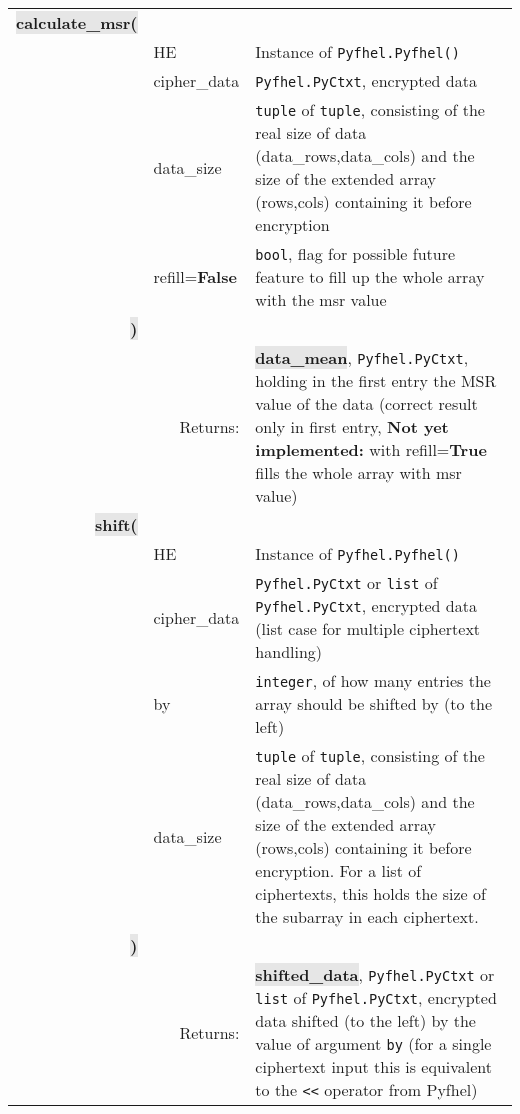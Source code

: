 \documentclass[a4paper]{article}
\newcommand{\python}[1]{\texttt{#1}}
\newcommand{\pymethod}[1]{{\ttfamily\colorbox[HTML]{e6e6e6}{\color[HTML]{0066ba}\textbf{\small #1}}}}
\newcommand{\pyreturn}[1]{{\ttfamily\colorbox[HTML]{e6e6e6}{\color[HTML]{ba0066}\textbf{\small #1}}}}
\newcommand{\textbool}[1]{{\color[HTML]{008700}\textbf{\small #1}}}
\begin{document}
\begin{tabular}{r|p{3cm}|p{8cm}}
\pymethod{calculate\_msr(}&&\\
&HE&Instance of \python{Pyfhel.Pyfhel()}\\
&cipher\_data&\python{Pyfhel.PyCtxt}, encrypted data\\
&data\_size&\python{tuple} of \python{tuple}, consisting of the real size of data (data\_rows,data\_cols) and the size of the extended array (rows,cols) containing it before encryption\\
&refill=\textbool{False}&\python{bool}, flag for possible future feature to fill up the whole array with the msr value\\
\pymethod{)}&&\\
&\multicolumn{1}{r|}{Returns:}&\pyreturn{data\_mean}, \python{Pyfhel.PyCtxt}, holding in the first entry the MSR value of the data (correct result only in first entry, \textbf{Not yet implemented:} with refill=\textbool{True} fills the whole array with msr value)\\
\hline
\pymethod{shift(}&&\\
&HE&Instance of \python{Pyfhel.Pyfhel()}\\
&cipher\_data&\python{Pyfhel.PyCtxt} or \python{list} of \python{Pyfhel.PyCtxt}, encrypted data (list case for multiple ciphertext handling)\\
&by&\python{integer}, of how many entries the array should be shifted by (to the left)\\
&data\_size&\python{tuple} of \python{tuple}, consisting of the real size of data (data\_rows,data\_cols) and the size of the extended array (rows,cols) containing it before encryption. For a list of ciphertexts, this holds the size of the subarray in each ciphertext.\\
\pymethod{)}&&\\
&\multicolumn{1}{r|}{Returns:}&\pyreturn{shifted\_data}, \python{Pyfhel.PyCtxt} or \python{list} of \python{Pyfhel.PyCtxt}, encrypted data shifted (to the left) by the value of argument \python{by} (for a single ciphertext input this is equivalent to the \python{<<} operator from Pyfhel)\\
\end{tabular}
\end{document}
